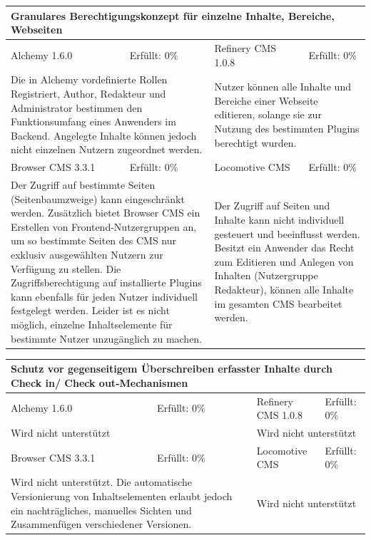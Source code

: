 \begin{tabular}[!ht]{|l|l|l|l|}
\hline
\multicolumn{4}{|p{15cm}|}{\textbf{Granulares Berechtigungskonzept für einzelne Inhalte, Bereiche, Webseiten}} \\
\hline
  Alchemy 1.6.0 & \cellcolor{red}Erfüllt: 0\% & Refinery CMS 1.0.8 & \cellcolor{red}Erfüllt: 0\% \\
  \hline
  \multicolumn{2}{|p{7.5cm}|}{Die in Alchemy vordefinierte Rollen Registriert, Author, Redakteur und Administrator bestimmen den Funktionsumfang eines Anwenders im Backend. Angelegte Inhalte können jedoch nicht einzelnen Nutzern zugeordnet werden.}
   & \multicolumn{2}{p{7.5cm}|}{Nutzer können alle Inhalte und Bereiche einer Webseite editieren, solange sie zur Nutzung des bestimmten Plugins berechtigt wurden.} \\
  \hline
  Browser CMS 3.3.1 & \cellcolor{red}Erfüllt: 0\% & Locomotive CMS & \cellcolor{red}Erfüllt: 0\% \\
  \hline
  \multicolumn{2}{|p{7.5cm}|}{ Der Zugriff auf bestimmte Seiten (Seitenbaumzweige)  kann eingeschränkt werden. Zusätzlich bietet Browser CMS ein Erstellen von Frontend-Nutzergruppen an, um so bestimmte Seiten des CMS nur exklusiv ausgewählten Nutzern zur Verfügung zu stellen. Die Zugriffsberechtigung auf installierte Plugins kann ebenfalls für jeden Nutzer individuell festgelegt werden. Leider ist es nicht möglich, einzelne Inhaltselemente für bestimmte Nutzer unzugänglich zu machen.} & \multicolumn{2}{p{7.5cm}|}{Der Zugriff auf Seiten und Inhalte kann nicht individuell gesteuert und beeinflusst werden. Besitzt ein Anwender das Recht zum Editieren und Anlegen von Inhalten (Nutzergruppe Redakteur), können alle Inhalte im gesamten CMS bearbeitet werden.} \\
\hline
\end{tabular}
\newline
\newline
\newline
\begin{tabular}[!ht]{|l|l|l|l|}
\hline
\multicolumn{4}{|p{15cm}|}{\textbf{Schutz vor gegenseitigem Überschreiben erfasster Inhalte durch Check in/ Check out-Mechanismen}} \\
\hline
  Alchemy 1.6.0 & \cellcolor{red}Erfüllt: 0\% & Refinery CMS 1.0.8 & \cellcolor{red}Erfüllt: 0\% \\
  \hline
  \multicolumn{2}{|p{7.5cm}|}{Wird nicht unterstützt} & \multicolumn{2}{p{7.5cm}|}{Wird nicht unterstützt} \\
  \hline
  Browser CMS 3.3.1 & \cellcolor{red}Erfüllt: 0\% & Locomotive CMS & \cellcolor{red}Erfüllt: 0\% \\
  \hline
  \multicolumn{2}{|p{7.5cm}|}{Wird nicht unterstützt. Die automatische Versionierung von Inhaltselementen erlaubt jedoch ein nachträgliches, manuelles Sichten und Zusammenfügen  verschiedener Versionen.} & \multicolumn{2}{p{7.5cm}|}{Wird nicht unterstützt} \\
\hline
\end{tabular}
